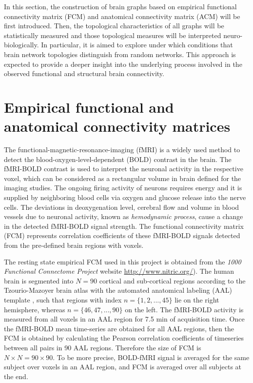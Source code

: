 In this section, the construction of brain graphs based on empirical functional connectivity matrix (FCM) and anatomical connectivity matrix (ACM) will be first introduced. Then, the topological characteristics of all graphs will be statistically measured and those topological measures will be interpreted neuro-biologically. In particular, it is aimed to explore under which conditions that brain network topologies distinguish from random networks. This approach is expected to provide a deeper insight into the underlying process involved in the observed functional and structural brain connectivity. 


\section{Empirical functional and anatomical connectivity matrices}

The functional-magnetic-resonance-imaging (fMRI) is a widely used method to detect the blood-oxygen-level-dependent (BOLD) contrast in the brain. The fMRI-BOLD contrast is used to interpret the neuronal activity in the respective voxel, which can be considered as a rectangular volume in brain defined for the imaging studies. The ongoing firing activity of neurons requires energy and it is supplied by neighboring blood cells via oxygen and glucose release into the nerve cells. The deviations in deoxygenation level, cerebral flow and volume in blood vessels due to neuronal activity, known as \textit{hemodynamic process}, cause a change in the detected fMRI-BOLD signal strength. The functional connectivity matrix (FCM) represents correlation coefficients of these fMRI-BOLD signals detected from the pre-defined brain regions with voxels. 

The resting state empirical FCM used in this project is obtained from the \textit{1000 Functional Connectome Project} website \url{http://www.nitric.org/}). The human brain is segmented into $N=90$ cortical and sub-cortical regions according to the Tzourio-Mazoyer brain atlas with the automated anatomical labeling (AAL) template  \citep{TZO02}, such that regions with index $n=\{1,2,...,45\}$ lie on the right hemisphere, whereas $n=\{46,47,...,90\}$ on the left. The fMRI-BOLD activity is measured from all voxels in an AAL region for 7.5 min of acquisition time. Once the fMRI-BOLD mean time-series are obtained for all AAL regions, then the FCM is obtained by calculating the Pearson correlation coefficients of timeseries between all pairs in 90 AAL regions. Therefore the size of FCM is $N\times N = 90 \times 90$.  To be more precise, BOLD-fMRI signal is averaged for the same subject over voxels in an AAL region, and FCM is averaged over all subjects at the end. 

